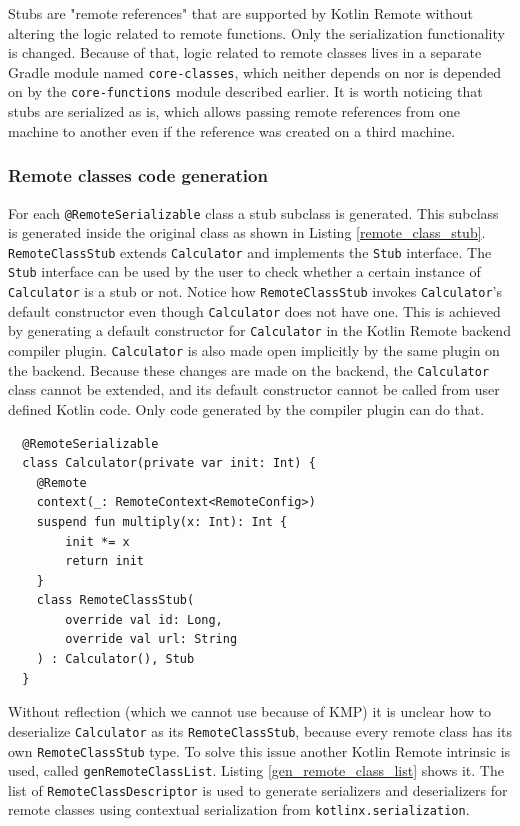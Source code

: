 \documentclass[a4paper,11pt,oneside]{article}
\newcommand{\kotlini}[1]{\texttt{#1}}
\newcommand{\ki}[1]{\kotlini{#1}}
\begin{document}
Stubs are "remote references" that are supported by Kotlin Remote without altering the logic
related to remote functions. Only the serialization functionality is changed. Because of that, logic
related to remote classes lives in a separate Gradle module named \ki{core-classes}, which
neither depends on nor is depended on by the \ki{core-functions} module described earlier. It is worth
noticing that stubs are serialized as is, which allows passing remote references from one machine to
another even if the reference was created on a third machine.

\subsubsection{Remote classes code generation}

For each \ki{@RemoteSerializable} class a stub subclass is generated. This
subclass is generated inside the original class as shown in Listing \ref{remote_class_stub}.
\ki{RemoteClassStub} extends \ki{Calculator} and implements the \ki{Stub} interface. The \ki{Stub}
interface can be used by the user to check whether a certain instance of \ki{Calculator} is a stub or not.
Notice how \ki{RemoteClassStub} invokes \ki{Calculator}'s default constructor even though
\ki{Calculator} does not have one. This is achieved by generating a default constructor for
\ki{Calculator} in the Kotlin Remote backend compiler plugin. \ki{Calculator} is also made open
implicitly by the same plugin on the backend. Because these changes are made on the backend, the
\ki{Calculator} class cannot be extended, and its default constructor cannot be called from user
defined Kotlin code. Only code generated by the compiler plugin can do that.

\begin{listing}[!h]
  \begin{verbatim}
  @RemoteSerializable
  class Calculator(private var init: Int) {
    @Remote
    context(_: RemoteContext<RemoteConfig>)
    suspend fun multiply(x: Int): Int {
        init *= x
        return init
    }
    class RemoteClassStub(
        override val id: Long,
        override val url: String
    ) : Calculator(), Stub
  }
  \end{verbatim}
  \caption{Remote class stub}\label{remote_class_stub}
\end{listing}

Without reflection (which we cannot use because of KMP) it is unclear how to deserialize
\ki{Calculator} as its \ki{RemoteClassStub}, because every remote class has its own \ki{RemoteClassStub} type.
To solve this issue another Kotlin Remote intrinsic is used, called \ki{genRemoteClassList}.
Listing \ref{gen_remote_class_list} shows it. The list of \ki{RemoteClassDescriptor} is used to generate
serializers and deserializers for remote classes using contextual serialization from \texttt{kotlinx.serialization}.
\end{document}
